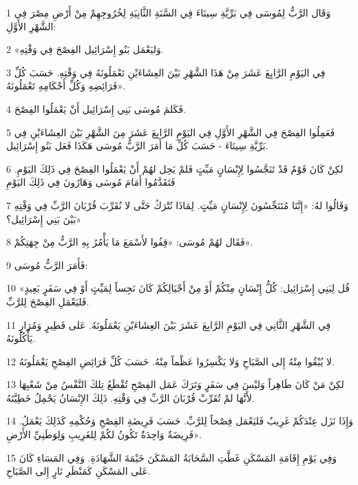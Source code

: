 \par 1 وَقَال الرَّبُّ لِمُوسَى فِي بَرِّيَّةِ سِينَاءَ فِي السَّنَةِ الثَّانِيَةِ لِخُرُوجِهِمْ مِنْ أَرْضِ مِصْرَ فِي الشَّهْرِ الأَوَّلِ:
\par 2 «وَليَعْمَل بَنُو إِسْرَائِيل الفِصْحَ فِي وَقْتِهِ.
\par 3 فِي اليَوْمِ الرَّابِعَ عَشَرَ مِنْ هَذَا الشَّهْرِ بَيْنَ العِشَاءَيْنِ تَعْمَلُونَهُ فِي وَقْتِهِ. حَسَبَ كُلِّ فَرَائِضِهِ وَكُلِّ أَحْكَامِهِ تَعْمَلُونَهُ».
\par 4 فَكَلمَ مُوسَى بَنِي إِسْرَائِيل أَنْ يَعْمَلُوا الفِصْحَ.
\par 5 فَعَمِلُوا الفِصْحَ فِي الشَّهْرِ الأَوَّلِ فِي اليَوْمِ الرَّابِعَ عَشَرَ مِنَ الشَّهْرِ بَيْنَ العِشَاءَيْنِ فِي بَرِّيَّةِ سِينَاءَ - حَسَبَ كُلِّ مَا أَمَرَ الرَّبُّ مُوسَى هَكَذَا فَعَل بَنُو إِسْرَائِيل.
\par 6 لكِنْ كَانَ قَوْمٌ قَدْ تَنَجَّسُوا لِإِنْسَانٍ مَيِّتٍ فَلمْ يَحِل لهُمْ أَنْ يَعْمَلُوا الفِصْحَ فِي ذَلِكَ اليَوْمِ. فَتَقَدَّمُوا أَمَامَ مُوسَى وَهَارُونَ فِي ذَلِكَ اليَوْمِ
\par 7 وَقَالُوا لهُ: «إِنَّنَا مُتَنَجِّسُونَ لِإِنْسَانٍ مَيِّتٍ. لِمَاذَا نُتْرَكُ حَتَّى لا نُقَرِّبَ قُرْبَانَ الرَّبِّ فِي وَقْتِهِ بَيْنَ بَنِي إِسْرَائِيل؟»
\par 8 فَقَال لهُمْ مُوسَى: «قِفُوا لأَسْمَعَ مَا يَأْمُرُ بِهِ الرَّبُّ مِنْ جِهَتِكُمْ».
\par 9 فَأَمَرَ الرَّبُّ مُوسَى:
\par 10 «قُل لِبَنِي إِسْرَائِيل: كُلُّ إِنْسَانٍ مِنْكُمْ أَوْ مِنْ أَجْيَالِكُمْ كَانَ نَجِساً لِمَيِّتٍ أَوْ فِي سَفَرٍ بَعِيدٍ فَليَعْمَلِ الفِصْحَ لِلرَّبِّ.
\par 11 فِي الشَّهْرِ الثَّانِي فِي اليَوْمِ الرَّابِعَ عَشَرَ بَيْنَ العِشَاءَيْنِ يَعْمَلُونَهُ. عَلى فَطِيرٍ وَمُرَارٍ يَأْكُلُونَهُ.
\par 12 لا يُبْقُوا مِنْهُ إِلى الصَّبَاحِ وَلا يَكْسِرُوا عَظْماً مِنْهُ. حَسَبَ كُلِّ فَرَائِضِ الفِصْحِ يَعْمَلُونَهُ.
\par 13 لكِنْ مَنْ كَانَ طَاهِراً وَليْسَ فِي سَفَرٍ وَتَرَكَ عَمَل الفِصْحِ تُقْطَعُ تِلكَ النَّفْسُ مِنْ شَعْبِهَا لأَنَّهَا لمْ تُقَرِّبْ قُرْبَانَ الرَّبِّ فِي وَقْتِهِ. ذَلِكَ الإِنْسَانُ يَحْمِلُ خَطِيَّتَهُ.
\par 14 وَإِذَا نَزَل عِنْدَكُمْ غَرِيبٌ فَليَعْمَل فِصْحاً لِلرَّبِّ. حَسَبَ فَرِيضَةِ الفِصْحِ وَحُكْمِهِ كَذَلِكَ يَعْمَلُ. فَرِيضَةٌ وَاحِدَةٌ تَكُونُ لكُمْ لِلغَرِيبِ وَلِوَطَنِيِّ الأَرْضِ».
\par 15 وَفِي يَوْمِ إِقَامَةِ المَسْكَنِ غَطَّتِ السَّحَابَةُ المَسْكَنَ خَيْمَةَ الشَّهَادَةِ. وَفِي المَسَاءِ كَانَ عَلى المَسْكَنِ كَمَنْظَرِ نَارٍ إِلى الصَّبَاحِ.
